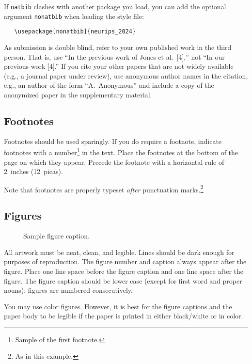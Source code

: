 \documentclass{article}
\begin{document}
If \verb+natbib+ clashes with another package you load, you can add the optional
argument \verb+nonatbib+ when loading the style file:
\begin{verbatim}
   \usepackage[nonatbib]{neurips_2024}
\end{verbatim}


As submission is double blind, refer to your own published work in the third
person. That is, use ``In the previous work of Jones et al.\ [4],'' not ``In our
previous work [4].'' If you cite your other papers that are not widely available
(e.g., a journal paper under review), use anonymous author names in the
citation, e.g., an author of the form ``A.\ Anonymous'' and include a copy of the anonymized paper in the supplementary material.


\subsection{Footnotes}


Footnotes should be used sparingly.  If you do require a footnote, indicate
footnotes with a number\footnote{Sample of the first footnote.} in the
text. Place the footnotes at the bottom of the page on which they appear.
Precede the footnote with a horizontal rule of 2~inches (12~picas).


Note that footnotes are properly typeset \emph{after} punctuation
marks.\footnote{As in this example.}


\subsection{Figures}


\begin{figure}
  \centering
  \fbox{\rule[-.5cm]{0cm}{4cm} \rule[-.5cm]{4cm}{0cm}}
  \caption{Sample figure caption.}
\end{figure}


All artwork must be neat, clean, and legible. Lines should be dark enough for
purposes of reproduction. The figure number and caption always appear after the
figure. Place one line space before the figure caption and one line space after
the figure. The figure caption should be lower case (except for first word and
proper nouns); figures are numbered consecutively.


You may use color figures.  However, it is best for the figure captions and the
paper body to be legible if the paper is printed in either black/white or in
color.
\end{document}
